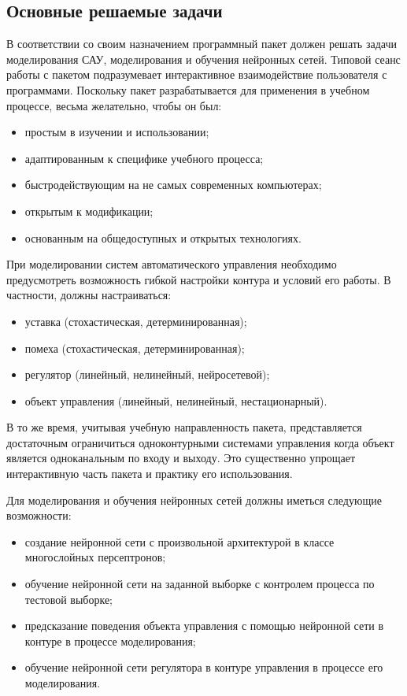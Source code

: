 
\subsection{Основные решаемые задачи}\label{main_tasks}

В соответствии со своим назначением программный пакет должен решать
задачи моделирования САУ, моделирования и обучения нейронных сетей.
Типовой сеанс работы с пакетом подразумевает интерактивное
взаимодействие пользователя с программами.  Поскольку пакет
разрабатывается для применения в учебном процессе, весьма желательно,
чтобы он был:
\begin{itemize}
\item простым в изучении и использовании;
\item адаптированным к специфике учебного процесса;
\item быстродействующим на не самых современных компьютерах;
\item открытым к модификации;
\item основанным на общедоступных и открытых технологиях.
\end{itemize}

При моделировании систем автоматического управления необходимо
предусмотреть возможность гибкой настройки контура и условий его
работы.  В частности, должны настраиваться:
\begin{itemize}
\item уставка (стохастическая, детерминированная);
\item помеха (стохастическая, детерминированная);
\item регулятор (линейный, нелинейный, нейросетевой);
\item объект управления (линейный, нелинейный, нестационарный).
\end{itemize}


В то же время, учитывая учебную направленность пакета, представляется
достаточным ограничиться одноконтурными системами управления когда
объект является одноканальным по входу и выходу.  Это существенно
упрощает интерактивную часть пакета и практику его использования.

Для моделирования и обучения нейронных сетей должны иметься следующие
возможности:
\begin{itemize}
\item создание нейронной сети с произвольной архитектурой в классе
  многослойных персептронов;
\item обучение нейронной сети на заданной выборке с контролем процесса
  по тестовой выборке;
\item предсказание поведения объекта управления с помощью нейронной
  сети в контуре в процессе моделирования;
\item обучение нейронной сети регулятора в контуре управления в
  процессе его моделирования.
\end{itemize}

